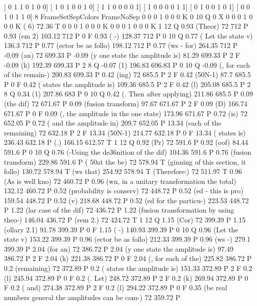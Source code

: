 [ 0 1 1 0 1 0 0]
[ 1 0 1 0 0 1 0]
[ 1 1 0 0 0 0 1]
[ 1 0 0 0 0 1 1]
[ 0 1 0 0 1 0 1]
[ 0 0 1 0 1 1 0]
 8 FrameSetSepColors
FrameNoSep
0 0 0 1 0 0 0 K
0 10 Q
0 X
0 0 0 1 0 0 0 K
(                                                                                        6) 72 36 T
0 0 0 1 0 0 0 K
0 0 0 1 0 0 0 K
1 12 Q
0.93 (Theor) 72 712 P
0.93 (em 2) 103.12 712 P
0 F
0.93 ( -) 128.37 712 P
0 10 Q
0.77 ( Let the state v) 136.3 712 P
0.77 (ector be as follo) 198.12 712 P
0.77 (ws - for) 264.35 712 P
-0.09 (an) 72 699.33 P
-0.09 (y one state the amplitude is) 81.29 699.33 P
2 F
-0.09 (k) 192.39 699.33 P
2 8 Q
-0.07 (1) 196.83 696.83 P
0 10 Q
-0.09 (, for each of the remain-) 200.83 699.33 P
0.42 (ing) 72 685.5 P
2 F
0.42 (\050N-1) 87.7 685.5 P
0 F
0.42 ( states the amplitude is) 109.36 685.5 P
2 F
0.42 (l) 205.08 685.5 P
2 8 Q
0.34 (1) 207.86 683 P
0 10 Q
0.42 (. Then after applying) 211.86 685.5 P
0.09 (the dif) 72 671.67 P
0.09 (fusion transform) 97.67 671.67 P
2 F
0.09 (D) 166.74 671.67 P
0 F
0.09 (, the amplitude in the one state) 173.96 671.67 P
0.72 (is) 72 652.05 P
0.72 ( and the amplitude in) 209.7 652.05 P
13.34 (each of the remaining) 72 632.18 P
2 F
13.34 (\050N-1) 214.77 632.18 P
0 F
13.34 ( states is) 236.43 632.18 P
(.) 166.15 612.57 T
1 12 Q
0.92 (Pr) 72 591.6 P
0.92 (oof) 84.44 591.6 P
0 10 Q
0.76 (-Using the de\336nition of the dif) 104.36 591.6 P
0.76 (fusion transform) 229.86 591.6 P
( \050at the be) 72 578.94 T
(ginning of this section, it follo) 130.72 578.94 T
(ws that) 254.92 578.94 T
(Therefore:) 72 511.97 T
0.96 (As is well kno) 72 460.72 P
0.96 (wn, in a unitary transformation the total) 132.12 460.72 P
0.52 (probability is conserv) 72 448.72 P
0.52 (ed - this is pro) 159.54 448.72 P
0.52 (v) 218.68 448.72 P
0.52 (ed for the particu-) 223.53 448.72 P
1.22 (lar case of the dif) 72 436.72 P
1.22 (fusion transformation by using theo-) 146.04 436.72 P
(rem 2.) 72 424.72 T
1 12 Q
1.15 (Cor) 72 399.39 P
1.15 (ollary 2.1) 91.78 399.39 P
0 F
1.15 ( -) 140.93 399.39 P
0 10 Q
0.96 (Let the state v) 153.22 399.39 P
0.96 (ector be as follo) 212.33 399.39 P
0.96 (ws -) 279.1 399.39 P
2.04 (for an) 72 386.72 P
2.04 (y one state the amplitude is) 97.49 386.72 P
2 F
2.04 (k) 221.38 386.72 P
0 F
2.04 (, for each of the) 225.82 386.72 P
0.2 (remaining) 72 372.89 P
0.2 ( states the amplitude is) 151.33 372.89 P
2 F
0.2 (l) 245.94 372.89 P
0 F
0.2 (. Let) 248.72 372.89 P
2 F
0.2 (k) 269.94 372.89 P
0 F
0.2 ( and) 274.38 372.89 P
2 F
0.2 (l) 294.22 372.89 P
0 F
0.35 (be real numbers \050in general the amplitudes can be com-) 72 359.72 P

